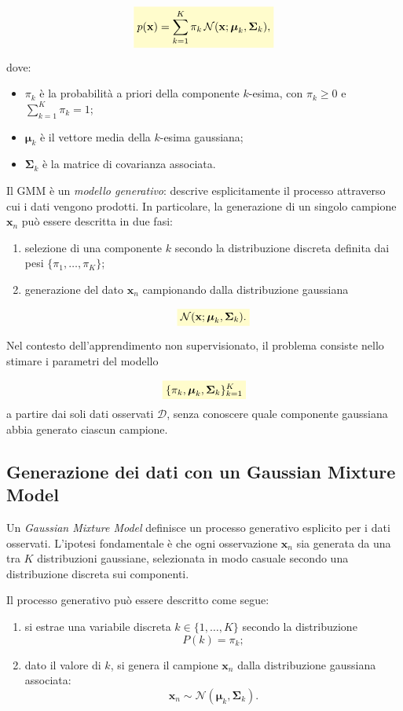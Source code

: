 \documentclass[a4paper,12pt]{report}
\newcommand{\highlight}[1]{%
\colorbox{yellow!20}{$\displaystyle #1$}%
}
\begin{document}
\[
\highlight{
p(\mathbf{x}) = \sum_{k=1}^{K} \pi_k \, \mathcal{N}(\mathbf{x}; \boldsymbol{\mu}_k, \boldsymbol{\Sigma}_k),}
\]

dove:
\begin{itemize}
    \item $\pi_k$ è la probabilità a priori della componente $k$-esima, con $\pi_k \geq 0$ e $\sum_{k=1}^{K} \pi_k = 1$;
    \item $\boldsymbol{\mu}_k$ è il vettore media della $k$-esima gaussiana;
    \item $\boldsymbol{\Sigma}_k$ è la matrice di covarianza associata.
\end{itemize}

Il GMM è un \emph{modello generativo}: descrive esplicitamente il processo attraverso cui i dati vengono prodotti.
In particolare, la generazione di un singolo campione $\mathbf{x}_n$ può essere descritta in due fasi:
\begin{enumerate}
    \item selezione di una componente $k$ secondo la distribuzione discreta definita dai pesi $\{\pi_1, \dots, \pi_K\}$;
    \item generazione del dato $\mathbf{x}_n$ campionando dalla distribuzione gaussiana

    \[
    \highlight{
    \mathcal{N}(\mathbf{x}; \boldsymbol{\mu}_k, \boldsymbol{\Sigma}_k).}
    \]

\end{enumerate}

Nel contesto dell’apprendimento non supervisionato, il problema consiste nello stimare i parametri del modello

\[
\highlight{
\{ \pi_k, \boldsymbol{\mu}_k, \boldsymbol{\Sigma}_k \}_{k=1}^{K}}
\]
a partire dai soli dati osservati $\mathcal{D}$, senza conoscere quale componente gaussiana abbia generato ciascun campione.


\subsection{Generazione dei dati con un Gaussian Mixture Model}

Un \emph{Gaussian Mixture Model} definisce un processo generativo esplicito per i dati osservati.
L’ipotesi fondamentale è che ogni osservazione $\mathbf{x}_n$ sia generata da una tra $K$ distribuzioni gaussiane, selezionata in modo casuale secondo una distribuzione discreta sui componenti.

Il processo generativo può essere descritto come segue:
\begin{enumerate}
    \item si estrae una variabile discreta $k \in \{1, \dots, K\}$ secondo la distribuzione
    \[
    P(k) = \pi_k;
    \]
    \item dato il valore di $k$, si genera il campione $\mathbf{x}_n$ dalla distribuzione gaussiana associata:
    \[
    \mathbf{x}_n \sim \mathcal{N}(\boldsymbol{\mu}_k, \boldsymbol{\Sigma}_k).
    \]
\end{enumerate}
\end{document}
